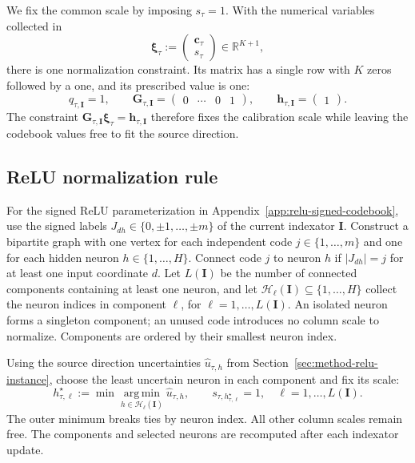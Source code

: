 We fix the common scale by imposing $s_\tau=1$. With the numerical
variables collected in
\begin{equation*}
    \boldsymbol\xi_\tau
    :=\begin{pmatrix}\mathbf c_\tau\\s_\tau\end{pmatrix}
    \in\mathbb R^{K+1},
\end{equation*}
there is one normalization constraint. Its matrix
has a single row with $K$ zeros followed by a one, and its prescribed
value is one:
\begin{equation}
    q_{\tau,\mathbf I}=1,\qquad
    \mathbf G_{\tau,\mathbf I}
        =\begin{pmatrix}0&\cdots&0&1\end{pmatrix},\qquad
    \mathbf h_{\tau,\mathbf I}=\begin{pmatrix}1\end{pmatrix}.
    \label{eq:appendix-calibration-constraint}
\end{equation}
The constraint $\mathbf G_{\tau,\mathbf I}\boldsymbol\xi_\tau
=\mathbf h_{\tau,\mathbf I}$ therefore fixes the calibration scale
while leaving the codebook values free to fit the source direction.

\subsection{ReLU normalization rule}
\label{app:relu-normalization}

For the signed ReLU parameterization in
Appendix~\ref{app:relu-signed-codebook}, use the signed labels
$J_{dh}\in\{0,\pm1,\ldots,\pm m\}$ of the current indexator
$\mathbf I$. Construct a bipartite graph with one vertex for each
independent code $j\in\{1,\ldots,m\}$ and one for each hidden neuron
$h\in\{1,\ldots,H\}$. Connect code $j$ to neuron $h$ if
$|J_{dh}|=j$ for at least one input coordinate $d$.
Let $L(\mathbf I)$ be the number of connected components containing
at least one neuron, and let
$\mathcal H_\ell(\mathbf I)\subseteq\{1,\ldots,H\}$ collect the
neuron indices in component $\ell$, for
$\ell=1,\ldots,L(\mathbf I)$. An isolated neuron forms a singleton
component; an unused code introduces no column scale to normalize.
Components are ordered by their smallest neuron index.

Using the source direction uncertainties $\widehat u_{\tau,h}$ from
Section~\ref{sec:method-relu-instance}, choose the least uncertain neuron
in each component and fix its scale:
\begin{equation}
    h_{\tau,\ell}^{\star}
        :=\min\operatorname*{arg\,min}_{h\in\mathcal H_\ell(\mathbf I)}
            \widehat u_{\tau,h},
    \qquad
    s_{\tau,h_{\tau,\ell}^{\star}}=1,
    \quad \ell=1,\ldots,L(\mathbf I).
    \label{eq:appendix-relu-normalization}
\end{equation}
The outer minimum breaks ties by neuron index. All other column
scales remain free. The components and selected neurons are recomputed
after each indexator update.

